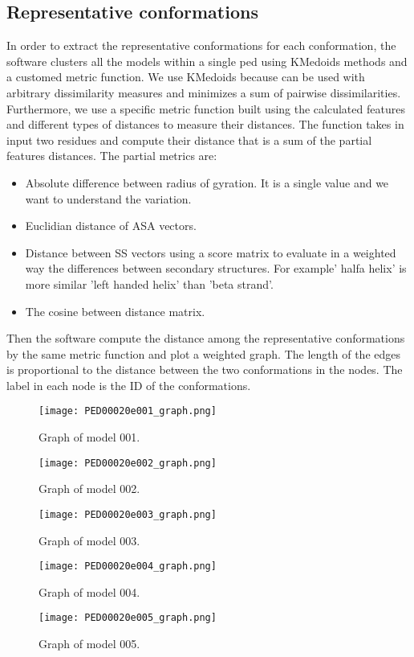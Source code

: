 \subsection{Representative conformations} 
In order to extract the representative conformations for each conformation, the software clusters all the models within a single ped using KMedoids methods and a customed metric function. 
We use KMedoids because can be used with arbitrary dissimilarity measures and minimizes a sum of pairwise dissimilarities. 
Furthermore, we use a specific metric function built using the calculated features and different types of distances to measure their distances. The function takes in input two residues and compute their distance that is a sum of the partial features distances.
The partial metrics are: 
\begin{itemize}
\item Absolute difference between radius of gyration. It is a single value and we want to understand the variation.
\item Euclidian distance of ASA vectors.
\item Distance between SS vectors using a score matrix to evaluate in a weighted way the differences between secondary structures. For example' halfa helix' is more similar 'left handed helix' than 'beta strand'. 
\item The cosine between distance matrix. 
\end{itemize}

Then the software compute the distance among the representative conformations by the same metric function and plot a weighted graph. The length of the edges is proportional to the distance between the two conformations in the nodes. The label in each node is the ID of the conformations.

\begin{figure}[H]
	\begin{minipage}[b]{0.47\textwidth}
		\centering
		\texttt{[image: PED00020e001\_graph.png]}
		\caption{Graph of model 001.}
		\label{model001}
	\end{minipage}
	\hfill
	\begin{minipage}[b]{0.47\textwidth}
		\centering
		\texttt{[image: PED00020e002\_graph.png]}
		\caption{Graph of model 002.}
		\label{model002}
	\end{minipage}
	\hfill
	\begin{minipage}[b]{0.47\textwidth}
		\centering
		\texttt{[image: PED00020e003\_graph.png]}
		\caption{Graph of model 003.}
		\label{model003}
	\end{minipage}
	\begin{minipage}[b]{0.47\textwidth}
		\centering
		\texttt{[image: PED00020e004\_graph.png]}
		\caption{Graph of model 004.}
		\label{model004}
	\end{minipage}
	\hfill
	\begin{minipage}[b]{0.47\textwidth}
		\centering
		\texttt{[image: PED00020e005\_graph.png]}
		\caption{Graph of model 005.}
		\label{model005}
	\end{minipage}
	\end{figure}

